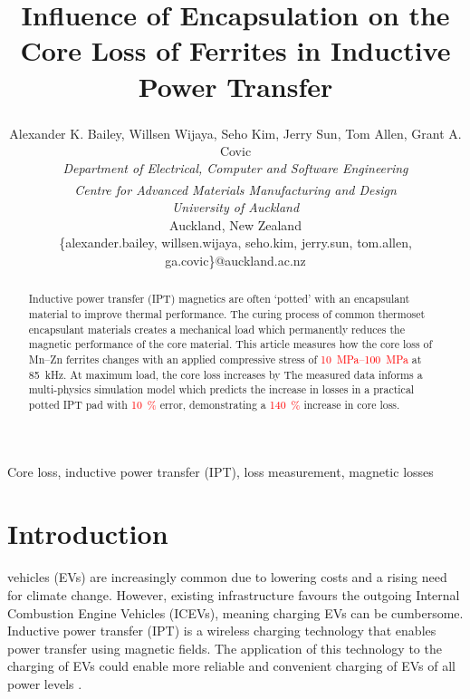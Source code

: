 \documentclass[conference]{IEEEtran}
\begin{document}
\title{Influence of Encapsulation on the Core Loss of Ferrites in Inductive Power Transfer}

\author{
  Alexander K. Bailey, Willsen Wijaya\textsuperscript{\textdagger}, Seho Kim, Jerry Sun\textsuperscript{\textdagger}, Tom Allen\textsuperscript{\textdagger}, Grant A. Covic\\
  \textit{Department of Electrical, Computer and Software Engineering}\\
  \textit{\textsuperscript{\textdagger}Centre for Advanced Materials Manufacturing and Design}\\
  \textit{University of Auckland}\\
  Auckland, New Zealand\\
  \{alexander.bailey, willsen.wijaya, seho.kim, jerry.sun, tom.allen, ga.covic\}@auckland.ac.nz\\ 
}
\maketitle
\thispagestyle{plain}
\pagestyle{plain}

\begin{abstract}
  Inductive power transfer (IPT) magnetics are often `potted' with an encapsulant material to improve thermal performance.
  The curing process of common thermoset encapsulant materials creates a mechanical load which permanently reduces the magnetic performance of the core material. 
  This article measures how the core loss of Mn--Zn ferrites changes with an applied compressive stress of \textcolor{red}{\SIrange{10}{100}{\mega\pascal}} at \SI{85}{\kilo\hertz}. 
  At maximum load, the core loss increases by 
  The measured data informs a multi-physics simulation model which predicts the increase in losses in a practical potted IPT pad with \textcolor{red}{\SI{10}{\percent}} error, demonstrating a \textcolor{red}{\SI{140}{\percent}} increase in core loss. 
\end{abstract}

\begin{IEEEkeywords}
Core loss, inductive power transfer (IPT), loss measurement, magnetic losses
\end{IEEEkeywords}

\section{Introduction}
 vehicles (EVs) are increasingly common due to lowering costs and a rising need for climate change. 
However, existing infrastructure favours the outgoing Internal Combustion Engine Vehicles (ICEVs), meaning charging EVs can be cumbersome. 
Inductive power transfer (IPT) is a wireless charging technology that enables power transfer using magnetic fields. 
The application of this technology to the charging of EVs could enable more reliable and convenient charging of EVs of all power levels \cite{covicModernTrendsInductive2013b}. 
\end{document}
